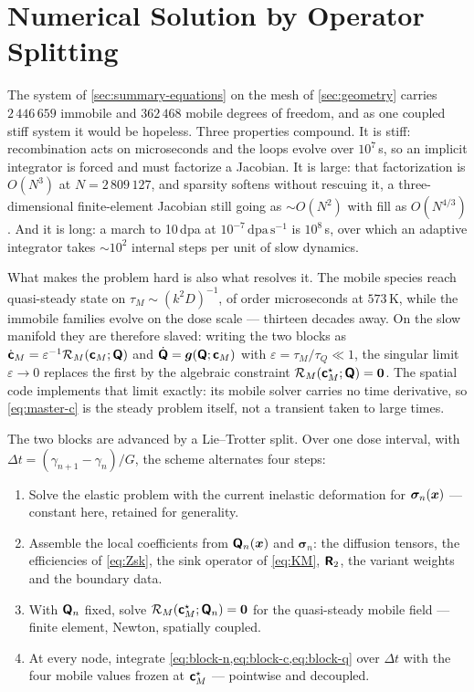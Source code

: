 \section{Numerical Solution by Operator Splitting}\label{sec:split}%
\label{sec:why-split}

The system of \cref{sec:summary-equations} on the mesh of \cref{sec:geometry}
carries $2\,446\,659$ immobile and $362\,468$ mobile degrees of freedom, and as
one coupled stiff system it would be hopeless. Three properties compound. It is
stiff: recombination acts on microseconds and the loops evolve over
$10^{7}\,$s, so an implicit integrator is forced and must factorize a Jacobian. It is
large: that factorization is $O(N^{3})$ at $N=2\,809\,127$, and sparsity softens
without rescuing it, a three-dimensional finite-element Jacobian still going as
$\sim O(N^{2})$ with fill as $O(N^{4/3})$. And it is long: a march to 10\,dpa at
$10^{-7}\,\mathrm{dpa\,s^{-1}}$ is $10^{8}\,$s, over which an adaptive
integrator takes $\sim10^{2}$ internal steps per unit of slow dynamics.

What makes the problem hard is also what resolves it. The mobile species reach
quasi-steady state on $\tau_M\sim(k^{2}D)^{-1}$, of order microseconds at
$573\,$K, while the immobile families evolve on the dose scale --- thirteen
decades away. On the slow manifold they are therefore slaved: writing the two
blocks as $\dot{\bm{\mathsf{c}}}_M=\varepsilon^{-1}\mathcal R_M(\bm{\mathsf{c}}_M;\bm{\mathsf{Q}})$
and $\dot{\bm{\mathsf{Q}}}=\bm g(\bm{\mathsf{Q}};\bm{\mathsf{c}}_M)$ with
$\varepsilon=\tau_M/\tau_Q\ll1$, the singular limit $\varepsilon\to0$ replaces
the first by the algebraic constraint
$\mathcal R_M(\bm{\mathsf{c}}^{\star}_M;\bm{\mathsf{Q}})=\bm 0$. The spatial code implements
that limit exactly: its mobile solver carries no time derivative, so
\cref{eq:master-c} is the steady problem itself, not a transient taken to
large times.

The two blocks are advanced by a Lie--Trotter split. Over one dose interval,
with $\Delta t=(\gamma_{n+1}-\gamma_n)/G$, the scheme alternates four steps:

\begin{enumerate}[label=\textbf{S\arabic*.},itemsep=2pt]
\item Solve the elastic problem with the current inelastic deformation for
      $\bm\sigma_n(\bm{x})$ --- constant here, retained for generality.
\item Assemble the local coefficients from $\bm{\mathsf{Q}}_n(\bm{x})$ and $\bm\sigma_n$:
      the diffusion tensors, the efficiencies of \cref{eq:Zsk}, the sink
      operator of \cref{eq:KM}, $\bm{\mathsf{R}}_2$, the variant weights and the
      boundary data.
\item With $\bm{\mathsf{Q}}_n$ fixed, solve
      $\mathcal R_M(\bm{\mathsf{c}}^{\star}_M;\bm{\mathsf{Q}}_n)=\bm 0$ for the quasi-steady
      mobile field --- finite element, Newton, spatially coupled.
\item At every node, integrate \cref{eq:block-n,eq:block-c,eq:block-q} over
      $\Delta t$ with the four mobile values frozen at $\bm{\mathsf{c}}^{\star}_M$ ---
      pointwise and decoupled.
\end{enumerate}

